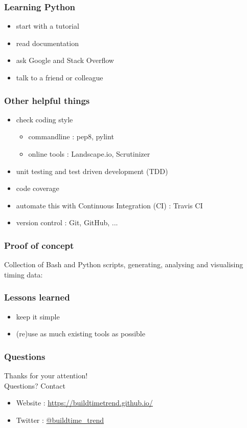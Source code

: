 \documentclass[14pt]{beamer}
\begin{document}
  \begin{frame}
    \frametitle{Learning Python}
    \begin{itemize}
      \item start with a tutorial
      \item read documentation
      \item ask Google and Stack Overflow
      \item talk to a friend or colleague
    \end{itemize}
  \end{frame}
  \begin{frame}
    \frametitle{Other helpful things}
    \begin{itemize}
      \item check coding style
        \begin{itemize}
          \item commandline : pep8, pylint
          \item online tools : Landscape.io, Scrutinizer
        \end{itemize}
      \item unit testing and test driven development (TDD)
      \item code coverage
      \item automate this with Continuous Integration (CI) : Travis CI
      \item version control : Git, GitHub, ...
    \end{itemize}
  \end{frame}
  \begin{frame}
    \frametitle{Proof of concept}
    Collection of Bash and Python scripts, generating, analysing and visualising timing data:
  \end{frame}

  \begin{frame}
    \frametitle{Lessons learned}
    \begin{itemize}
      \item keep it simple
      \item (re)use as much existing tools as possible
    \end{itemize}
  \end{frame}
  \begin{frame}
   \frametitle{Questions}
    Thanks for your attention!\\
    Questions?
    \vfill
    Contact
    \begin{itemize}
      \item Website : \href{https://buildtimetrend.github.io/}{https://buildtimetrend.github.io/}
      \item Twitter : \href{https://twitter.com/buildtime_trend}{@buildtime\_trend}
    \end{itemize}
  \end{frame}
\end{document}
